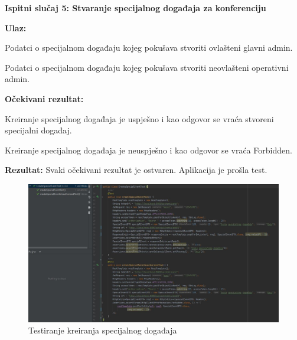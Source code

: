    
   			\textbf{Ispitni slučaj 5: Stvaranje specijalnog događaja za konferenciju \newline}
   
   \textbf{Ulaz:}
   \begin{packed_item}
   \item[] \begin{packed_enum}
				
				\item Podatci o specijalnom događaju kojeg pokušava stvoriti ovlašteni glavni admin.
    \item Podatci o specijalnom događaju kojeg pokušava stvoriti neovlašteni operativni admin.
				
			\end{packed_enum}
   \end{packed_item}

   \textbf{Očekivani rezultat:}
   \begin{packed_item}
   \item[] \begin{packed_enum}
				
				\item Kreiranje specijalnog događaja je uspješno i kao odgovor se vraća stvoreni specijalni događaj.
    \item  Kreiranje specijalnog događaja je neuspješno i kao odgovor se vraća Forbidden.
				
			\end{packed_enum}
   \end{packed_item}
   \textbf{Rezultat:} \text Svaki očekivani rezultat je ostvaren. \color{red} Aplikacija je prošla test. \color{black}

    \begin{figure}[H]
            \includegraphics[scale=0.55]{slike/CreateSpecialEventTest.JPG} %
			
			\centering
			\caption{Testiranje kreiranja specijalnog događaja}
			\label{fig:testiranje kreiranja specijalnog događaja}
			\end{figure}

